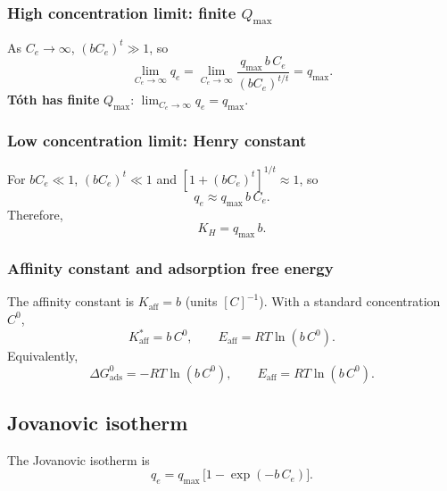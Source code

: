 \documentclass[journal=jacsat,manuscript=article]{achemso}
\begin{document}
\subsubsection{High concentration limit: finite $Q_{\max}$}

As $C_e \to \infty$, $(bC_e)^t \gg 1$, so
\begin{equation}
	\lim_{C_e \to \infty} q_e
	= \lim_{C_e \to \infty}
	\frac{q_{\max}\, b\, C_e}{(b C_e)^{t/t}}
	= q_{\max}.
\end{equation}
\textbf{T\'{o}th has finite }$Q_{\max}$:\quad
$\displaystyle \lim_{C_e \to \infty} q_e = q_{\max}$.%

\subsubsection{Low concentration limit: Henry constant}

For $bC_e \ll 1$, $(bC_e)^t \ll 1$ and $[1+(bC_e)^t]^{1/t} \approx 1$, so
\begin{equation}
	q_e \approx q_{\max}\, b\, C_e.
\end{equation}
Therefore,
\begin{equation}
	\boxed{K_H = q_{\max}\, b.}
\end{equation}

\subsubsection{Affinity constant and adsorption free energy}

The affinity constant is $K_{\mathrm{aff}} = b$ (units $[C]^{-1}$). With a standard concentration $C^0$,
\begin{equation}
	K_{\mathrm{aff}}^{\ast} = b\, C^0,
	\qquad
	E_{\mathrm{aff}} = RT\ln(b\, C^0).
\end{equation}
Equivalently,
\begin{equation}
	\boxed{
		\Delta G_{\mathrm{ads}}^{0} = -RT\ln(b\, C^0),
		\qquad
		E_{\mathrm{aff}} = RT\ln(b\, C^0).
	}
\end{equation}

\subsection{Jovanovic isotherm}
\label{sec:si_jovanovic}

The Jovanovic isotherm is
\begin{equation}
	q_e = q_{\max}\,\bigl[1 - \exp(-b\, C_e)\bigr].
	\label{eq:si_jovanovic}
\end{equation}
\end{document}
